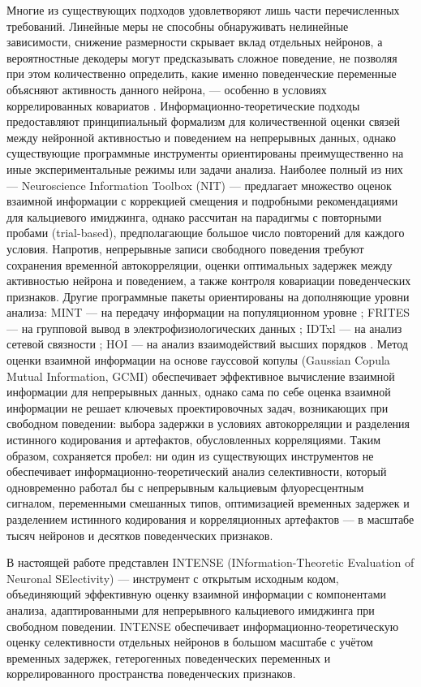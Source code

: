Многие из существующих подходов удовлетворяют лишь части перечисленных требований. Линейные меры не способны обнаруживать нелинейные зависимости, снижение размерности скрывает вклад отдельных нейронов, а вероятностные декодеры могут предсказывать сложное поведение, не позволяя при этом количественно определить, какие именно поведенческие переменные объясняют активность данного нейрона, --- особенно в условиях коррелированных ковариатов \cite{Kriegeskorte2019}.
Информационно-теоретические подходы предоставляют принципиальный формализм для количественной оценки связей между нейронной активностью и поведением на непрерывных данных, однако существующие программные инструменты ориентированы преимущественно на иные экспериментальные режимы или задачи анализа. Наиболее полный из них --- Neuroscience Information Toolbox (NIT) \cite{Maffulli2022} --- предлагает множество оценок взаимной информации с коррекцией смещения и подробными рекомендациями для кальциевого имиджинга, однако рассчитан на парадигмы с повторными пробами (trial-based), предполагающие большое число повторений для каждого условия. Напротив, непрерывные записи свободного поведения требуют сохранения временн\'{о}й автокорреляции, оценки оптимальных задержек между активностью нейрона и поведением, а также контроля ковариации поведенческих признаков. Другие программные пакеты ориентированы на дополняющие уровни анализа: MINT --- на передачу информации на популяционном уровне \cite{MINT2025}; FRITES --- на групповой вывод в электрофизиологических данных \cite{Frites2022}; IDTxl --- на анализ сетевой связности \cite{IDTxl2019}; HOI --- на анализ взаимодействий высших порядков \cite{Neri2024}. Метод оценки взаимной информации на основе гауссовой копулы (Gaussian Copula Mutual Information, GCMI) \cite{gcmi} обеспечивает эффективное вычисление взаимной информации для непрерывных данных, однако сама по себе оценка взаимной информации не решает ключевых проектировочных задач, возникающих при свободном поведении: выбора задержки в условиях автокорреляции и разделения истинного кодирования и артефактов, обусловленных корреляциями. Таким образом, сохраняется пробел: ни один из существующих инструментов не обеспечивает информационно-теоретический анализ селективности, который одновременно работал бы с непрерывным кальциевым флуоресцентным сигналом, переменными смешанных типов, оптимизацией временных задержек и разделением истинного кодирования и корреляционных артефактов --- в масштабе тысяч нейронов и десятков поведенческих признаков.

В настоящей работе представлен INTENSE (INformation-Theoretic Evaluation of Neuronal SElectivity) --- инструмент с открытым исходным кодом, объединяющий эффективную оценку взаимной информации с компонентами анализа, адаптированными для непрерывного кальциевого имиджинга при свободном поведении. INTENSE обеспечивает информационно-теоретическую оценку селективности отдельных нейронов в большом масштабе с учётом временных задержек, гетерогенных поведенческих переменных и коррелированного пространства поведенческих признаков.


